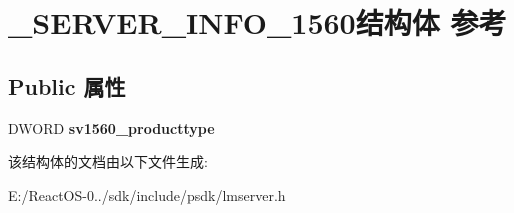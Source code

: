\hypertarget{struct___s_e_r_v_e_r___i_n_f_o__1560}{}\section{\+\_\+\+S\+E\+R\+V\+E\+R\+\_\+\+I\+N\+F\+O\+\_\+1560结构体 参考}
\label{struct___s_e_r_v_e_r___i_n_f_o__1560}
\subsection*{Public 属性}
\begin{DoxyCompactItemize}
\item 
\mbox{\label{struct___s_e_r_v_e_r___i_n_f_o__1560_a970c84866899400275f2cf751e7bc308}} 
D\+W\+O\+RD {\bfseries sv1560\+\_\+producttype}
\end{DoxyCompactItemize}


该结构体的文档由以下文件生成\+:\begin{DoxyCompactItemize}
\item 
E\+:/\+React\+O\+S-\/0../sdk/include/psdk/lmserver.\+h\end{DoxyCompactItemize}

